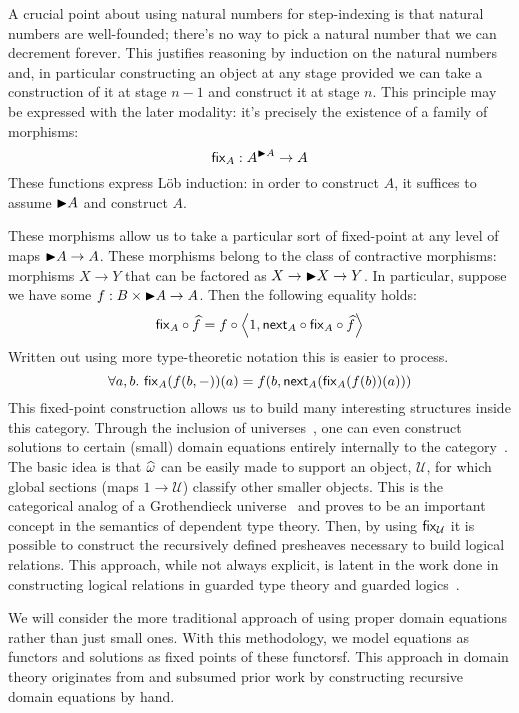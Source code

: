 A crucial point about using natural numbers for step-indexing is that
natural numbers are well-founded; there's no way to pick a natural
number that we can decrement forever. This justifies reasoning by
induction on the natural numbers and, in particular
constructing an object at any stage provided we can take a
construction of it at stage $n - 1$ and construct it at stage
$n$. This principle may be expressed with the later modality: it's
precisely the existence of a family of morphisms:
\[
  \mathsf{fix}_A : A^{{\blacktriangleright} A} \to A
\]
These functions express L\"ob induction: in order to construct $A$, it
suffices to assume ${\blacktriangleright} A$ and construct $A$.

These morphisms allow us to take a particular sort of fixed-point at
any level of maps ${\blacktriangleright} A \to A$. These morphisms belong to the
class of contractive morphisms: morphisms $X \to Y$ that can be
factored as $X \to {\blacktriangleright} X \to Y$. In particular, suppose we have
some $f : B \times {\blacktriangleright} A \to A$. Then the following equality holds:
\[
  \mathsf{fix}_A \circ \widehat{f} = f \circ \left\langle 1, \mathsf{next}_A \circ \mathsf{fix}_A \circ \widehat{f} \right\rangle
\]
Written out using more type-theoretic notation this is easier to
process.
\[
  \forall a, b.\ \fix_A(f(b, -))(a) = f (b, \delay_A(\fix_A(f(b))(a)))
\]
This fixed-point construction allows us to build many interesting
structures inside this category. Through the inclusion of
universes~\citep{Hofmann:90s}, one can even construct solutions to
certain (small) domain equations entirely internally to the
category~\citep{Birkedal:13}. The basic idea is that
$\widehat{\omega}$ can be easily made to support an object,
$\mathcal{U}$, for which global sections (maps $1 \to \mathcal{U}$)
classify other smaller objects. This is the categorical analog of a
Grothendieck universe~\citep{Streicher:04} and proves to be an
important concept in the semantics of dependent type theory. Then, by
using $\mathsf{fix}_{\mathcal{U}}$ it is possible to construct the recursively defined
presheaves necessary to build logical relations. This approach, while
not always explicit, is latent in the work done in constructing
logical relations in guarded type theory and guarded
logics~\citep{Dreyer:09,Paviotti:15,Krogh-Jespersen:17}.

We will consider the more traditional approach of using proper domain
equations rather than just small ones. With this methodology, we model
equations as functors and solutions as fixed points of these functorsf. This
approach in domain theory originates from \citet{Smyth:77} and
subsumed prior work by \citet{Scott:76} constructing recursive domain
equations by hand.

